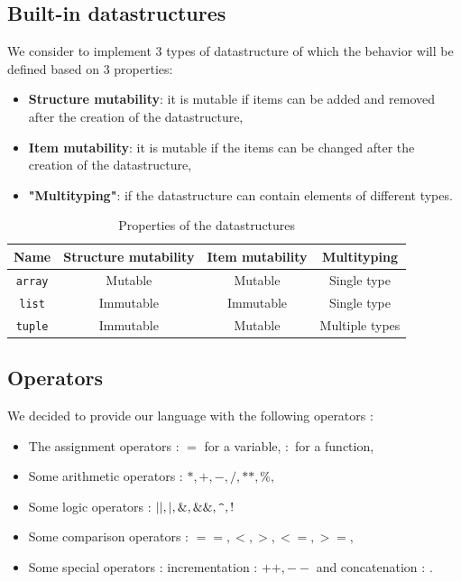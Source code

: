 \documentclass[a4paper,titlepage]{article}
\begin{document}
  \subsection{Built-in datastructures}

We consider to implement 3 types of datastructure of which the behavior will be defined based on 3 properties:
\begin{itemize}
  \item \textbf{Structure mutability}: it is mutable if items can be added and removed after the creation of the datastructure,
  \item \textbf{Item mutability}: it is mutable if the items can be changed after the creation of the datastructure,
  \item \textbf{"Multityping"}: if the datastructure can contain elements of different types. 
\end{itemize}

\begin{table}[h!]
  \center
  \begin{tabular}{c|ccc}
    Name & Structure mutability & Item mutability & Multityping\\
    \hline
    \texttt{array} & Mutable & Mutable & Single type\\
    \texttt{list} & Immutable & Immutable & Single type\\
    \texttt{tuple} & Immutable & Mutable & Multiple types
  \end{tabular}
  \caption{Properties of the datastructures}
\end{table}

  \subsection{Operators}
We decided to provide our language with the following operators :
\begin{itemize}
  \item The assignment operators : $ = $ for a variable, $ : $ for a function,
  \item Some arithmetic operators : $*, +, -, /, **, \%,$
  \item Some logic operators : $||, |, \&, \&\&, \verb+^+, !$
  \item Some comparison operators : $==, <, >, <=, >=,$
  \item Some special operators : incrementation : $++, --$ and concatenation : $.$ 
\end{itemize}


\newpage
\end{document}
